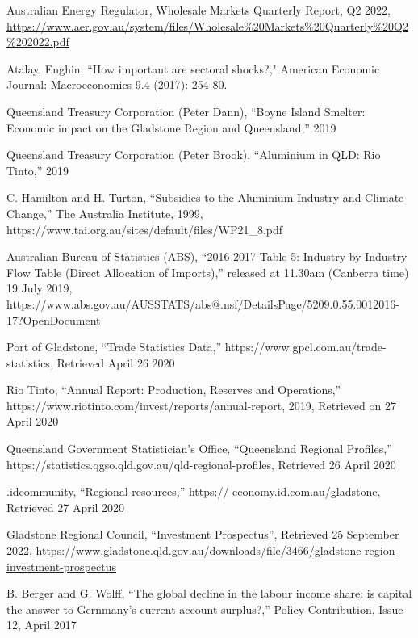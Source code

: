 \documentclass[12pt,a4paper]{article}
\begin{document}
\begin{thebibliography}{1}

   Australian Energy Regulator, Wholesale Markets Quarterly
    Report, Q2 2022, \url{https://www.aer.gov.au/system/files/Wholesale%20Markets%20Quarterly%20Q2%202022.pdf}

   Atalay, Enghin. ``How important are sectoral shocks?,"
    American Economic Journal: Macroeconomics 9.4 (2017): 254-80.

 Queensland Treasury Corporation (Peter Dann), “Boyne Island
  Smelter: Economic impact on the Gladstone Region and Queensland,” 2019

Queensland Treasury Corporation (Peter Brook), ``Aluminium in QLD: Rio Tinto,” 2019
  
C. Hamilton and H. Turton, ``Subsidies to the Aluminium
Industry and Climate Change,'' The Australia Institute, 1999, https://www.tai.org.au/sites/default/files/WP21\_8.pdf

 Australian Bureau of Statistics (ABS), ``2016-2017 Table 5: Industry by
  Industry Flow Table (Direct Allocation of Imports),” released at 11.30am
  (Canberra time) 19 July 2019, https://www.abs.gov.au/AUSSTATS/abs@.nsf/DetailsPage/5209.0.55.0012016-17?OpenDocument

 Port of Gladstone, ``Trade Statistics Data,''
 https://www.gpcl.com.au/trade-statistics, Retrieved  April 26 2020

  Rio Tinto, ``Annual Report: Production, Reserves and Operations,''
https://www.riotinto.com/invest/reports/annual-report, 2019, Retrieved on
27 April 2020

  Queensland Government Statistician’s Office,
  ``Queensland Regional Profiles,”
https://statistics.qgso.qld.gov.au/qld-regional-profiles, Retrieved 26 April 2020 
 
  .idcommunity, “Regional resources,” 
  https:// economy.id.com.au/gladstone, Retrieved 27 April 2020

  Gladstone Regional Council, ``Investment Prospectus'', Retrieved 25 September
    2022,
    \url{https://www.gladstone.qld.gov.au/downloads/file/3466/gladstone-region-investment-prospectus}

B. Berger and G. Wolff, “The global decline in the labour income share: is
capital the answer to Gernmany’s current account surplus?,” Policy Contribution,
Issue 12, April 2017


\end{thebibliography}
\end{document}
